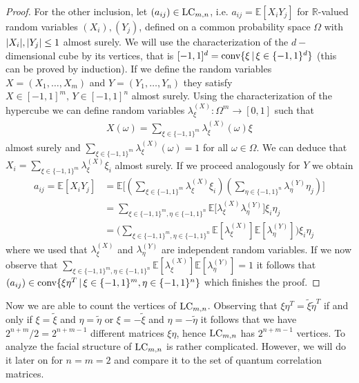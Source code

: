\begin{proof}
	For the other inclusion, let $ (a_{ij}) \in \textup{LC}_{m,n} $, i.e. $ a_{ij} = \mathbb{E}[X_iY_j] $ for $ \mathbb{R} $-valued random variables $ (X_i),(Y_j) $, defined on a common probability space $ \Omega $ with $ {\left|{X_i}\right|},{\left|{Y_j}\right|} \le 1 $ almost surely. 
	We will use the characterization of the $ d-$dimensional cube by its vertices, that is $ [-1,1]^d = \textup{conv} \{\xi \, | \, \xi \in \{-1,1 \}^d \}$ (this can be proved by induction). 
	If we define the random variables $ X= (X_1,\hdots,X_m) $ and $ Y= (Y_1,\hdots,Y_n) $ they satisfy $ X \in [-1,1]^m, \, Y \in [-1,1]^n $ almost surely. Using the characterization of the hypercube we can define random variables $ \lambda_{\xi}^{(X)}: \Omega^m \to [0,1] $ such that 
	\begin{align*}
		X(\omega) = \sum_{\xi \in \{-1,1\}^m}\lambda_{\xi}^{(X)}(\omega)\xi
	\end{align*} 
	almost surely 
	and $ \sum_{\xi \in \{-1,1\}^m}\lambda_{\xi}^{(X)}(\omega) = 1  $ for all $ \omega \in \Omega $. We can deduce that 
	$X_i =  \sum_{\xi \in \{-1,1\}^m}\lambda_{\xi}^{(X)}\xi_i $ almost surely.
	If we proceed analogously for $ Y $ we obtain
	\begin{align*}
		a_{ij} = \mathbb{E}[X_iY_j] &= \mathbb{E} \big [  (\sum_{\xi \in \{-1,1\}^m}\lambda_{\xi}^{(X)}\xi_i ) (\sum_{\eta \in \{-1,1\}^n}\lambda_{\eta}^{(Y)}\eta_j ) \big ]   \\
		&= \sum_{\xi \in \{-1,1\}^m, \eta \in \{-1,1\}^n} \mathbb{E}\big [\lambda_{\xi}^{(X)}\lambda_{\eta}^{(Y)} \big ] \xi_i \eta_j  \\
		&= \big (\sum_{\xi \in \{-1,1\}^m, \eta \in \{-1,1\}^n}\mathbb{E} [\lambda_{\xi}^{(X)} ]\mathbb{E}[\lambda_{\eta}^{(Y)}]\big )\xi_i\eta_j
	\end{align*}
	where we used that $ \lambda_{\xi}^{(X)} $ and $ \lambda_{\eta}^{(Y)} $ are independent random variables.
	If we now observe that $
		\sum_{\xi \in \{-1,1\}^m, \eta \in \{-1,1\}^n}\mathbb{E} [\lambda_{\xi}^{(X)} ]\mathbb{E}[\lambda_{\eta}^{(Y)}] = 1 $ it follows that $ (a_{ij}) \in  \textup{conv} \{  \xi\eta^T \, | \, \xi \in \{-1,1\}^m, \eta \in \{-1,1\}^n     \}$
 which finishes the proof.
\end{proof}
\noindent Now we are able to count the vertices of $ \textup{LC}_{m,n} $. Observing that $ \xi \eta^T = \tilde{\xi} \tilde{\eta}^T $ if and only if $ \xi = \tilde{\xi} $ and $ \eta = \tilde{\eta} $ or $ \xi = -\tilde{\xi} $ and $ \eta = -\tilde{\eta} $ it follows that we have $ 2^{n+m}/2 = 2^{n+m-1} $ different matrices $ \xi \eta $, hence $ \textup{LC}_{m,n} $ has $ 2^{n+m-1} $ vertices. To analyze the facial structure of $ \textup{LC}_{m,n} $ is rather complicated. 
However, we will do it later on for $ n=m=2 $ and compare it to the set of quantum correlation matrices. 


